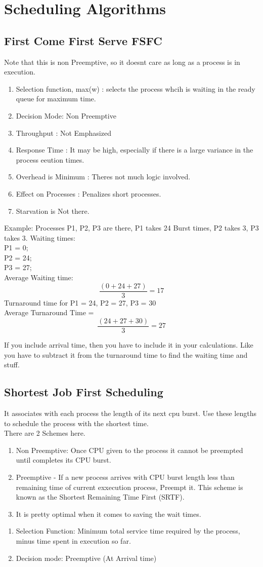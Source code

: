 \documentclass[11pt]{article}
\begin{document}
\section{Scheduling Algorithms}
\subsection{First Come First Serve FSFC}

Note that this is non Preemptive, so it doesnt care as long as a process is in execution. 
\begin{enumerate}
	\item Selection function, max(w) : selects the process whcih is waiting in the ready queue for maximum time. 
	\item Decision Mode: Non Preemptive
	\item Throughput : Not Emphasized
	\item Response Time : It may be high, especially if there is a large variance in the process eeution times. 
	\item Overhead is Minimum : Theres not much logic involved.  
	\item Effect on Processes : Penalizes short processes. 
	\item Starvation is Not there. 
\end{enumerate}

Example: Processes P1, P2, P3 are there, P1 takes 24 Burst times, P2 takes 3, P3 takes 3. 
Waiting times: \\
P1 = 0;\\
P2 = 24;\\
P3 = 27;\\

Average Waiting time: $$\frac{(0 + 24 + 27)}{3} = 17 $$
Turnaround time for P1 = 24, P2 = 27, P3 = 30\\
Average Turnaround Time = $$\frac{(24 + 27 + 30)}{3} = 27 $$

If you include arrival time, then you have to include it in your calculations. Like you have to subtract it from the turnaround time to find the waiting time and stuff. 

\subsection{Shortest Job First Scheduling}

It associates with each process the length of its next cpu burst. Use these lengths to schedule the process with the shortest time. \\
There are 2 Schemes here. 
\begin{enumerate}
	\item Non Preemptive: Once CPU given to the process it cannot be preempted until completes its CPU burst.
	\item Preemptive -  If a new process arrives with CPU burst length less than remaining time of current exxecution process, Preempt it. This scheme is known as the Shortest Remaining Time First (SRTF).
	\item It is pretty optimal when it comes to saving the wait times. 
\end{enumerate}

\begin{enumerate}
	\item Selection Function: Minimum total service time required by the process, minus time spent in execution so far. 
	\item Decision mode: Preemptive (At Arrival time)
\end{enumerate}
\end{document}
